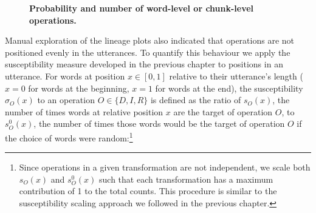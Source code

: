 \documentclass[a4paper,fleqn]{cas-dc}
\begin{document}
\begin{figure}
  \centering

  \caption[Probability and number of word-level or chunk-level operations]{
  \textbf{Probability and number of word-level or chunk-level operations.}
  }
  \label{fig:gistr-ops-counts}
\end{figure}

Manual exploration of the lineage plots also indicated that operations
are not positioned evenly in the utterances. To quantify this behaviour
we apply the susceptibility measure developed in the previous chapter to
positions in an utterance. For words at position \(x \in [0, 1]\)
relative to their utterance's length (\(x = 0\) for words at the
beginning, \(x = 1\) for words at the end), the susceptibility
\(\sigma_O(x)\) to an operation \(O \in \{D, I, R\}\) is defined as the
ratio of \(s_O(x)\), the number of times words at relative position
\(x\) are the target of operation \(O\), to \(s_O^0(x)\), the number of
times those words would be the target of operation \(O\) if the choice
of words were random:\footnote{Since operations in a given
  transformation are not independent, we scale both \(s_O(x)\) and
  \(s_O^0(x)\) such that each transformation has a maximum contribution
  of 1 to the total counts. This procedure is similar to the
  susceptibility scaling approach we followed in the previous chapter.}
\end{document}
